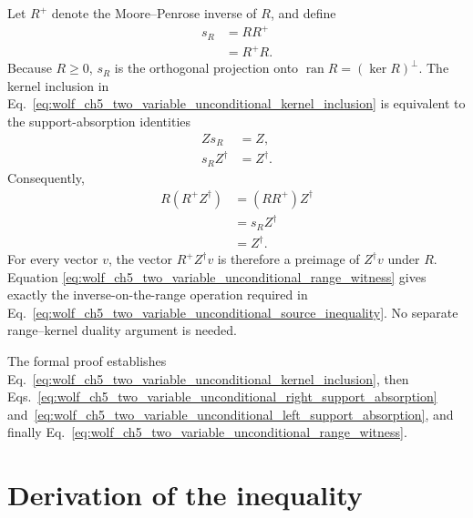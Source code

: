 \documentclass{article}
\begin{document}
Let $R^+$ denote the Moore--Penrose inverse of $R$, and define
\begin{align}
    s_R&=RR^+
    \label{eq:wolf_ch5_two_variable_unconditional_left_support_projection}\\
       &=R^+R.
    \label{eq:wolf_ch5_two_variable_unconditional_right_support_projection}
\end{align}
Because $R\geq 0$, $s_R$ is the orthogonal projection onto
$\operatorname{ran}R=(\ker R)^\perp$. The kernel inclusion in
Eq.~\ref{eq:wolf_ch5_two_variable_unconditional_kernel_inclusion} is
equivalent to the support-absorption identities
\begin{align}
    Zs_R&=Z,
    \label{eq:wolf_ch5_two_variable_unconditional_right_support_absorption}\\
    s_RZ^\dagger&=Z^\dagger.
    \label{eq:wolf_ch5_two_variable_unconditional_left_support_absorption}
\end{align}
Consequently,
\begin{align}
    R(R^+Z^\dagger)
        &=(RR^+)Z^\dagger
    \label{eq:wolf_ch5_two_variable_unconditional_range_witness_first}\\
        &=s_RZ^\dagger
    \label{eq:wolf_ch5_two_variable_unconditional_range_witness_second}\\
        &=Z^\dagger.
    \label{eq:wolf_ch5_two_variable_unconditional_range_witness}
\end{align}
For every vector $v$, the vector $R^+Z^\dagger v$ is therefore a preimage of
$Z^\dagger v$ under $R$. Equation
\ref{eq:wolf_ch5_two_variable_unconditional_range_witness} gives exactly the
inverse-on-the-range operation required in
Eq.~\ref{eq:wolf_ch5_two_variable_unconditional_source_inequality}. No
separate range--kernel duality argument is needed.

The formal proof establishes
Eq.~\ref{eq:wolf_ch5_two_variable_unconditional_kernel_inclusion}, then
Eqs.~\ref{eq:wolf_ch5_two_variable_unconditional_right_support_absorption}
and~\ref{eq:wolf_ch5_two_variable_unconditional_left_support_absorption}, and
finally Eq.~\ref{eq:wolf_ch5_two_variable_unconditional_range_witness}.

\section{Derivation of the inequality}
\end{document}
